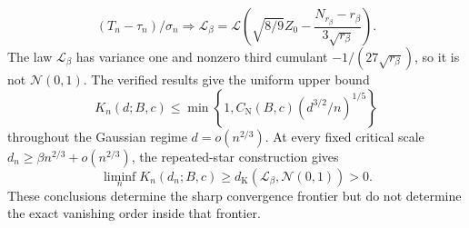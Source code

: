 \[
(T_n-\tau_n)/\sigma_n\Rightarrow\mathcal L_{\beta}=\mathcal L\left(\sqrt{8/9}Z_0-\frac{N_{r_{\beta}}-r_{\beta}}{3\sqrt{r_{\beta}}}\right).
\]
The law \(\mathcal L_{\beta}\) has variance one and nonzero third cumulant \(-1/(27\sqrt{r_{\beta}})\), so it is not \(\mathcal N(0,1)\).
The verified results give the uniform upper bound
\[
 K_n(d;B,c)\le \min\left\{1,C_{\mathrm N}(B,c)
 \left(d^{3/2}/n\right)^{1/5}\right\}
\]
throughout the Gaussian regime \(d=o(n^{2/3})\).  At every fixed critical scale \(d_n\ge \beta n^{2/3}+o(n^{2/3})\), the repeated-star construction gives
\[
 \liminf_nK_n(d_n;B,c)\ge
 d_{\mathrm K}(\mathcal L_\beta,\mathcal N(0,1))>0.
\]
These conclusions determine the sharp convergence frontier but do not determine the exact vanishing order inside that frontier.
